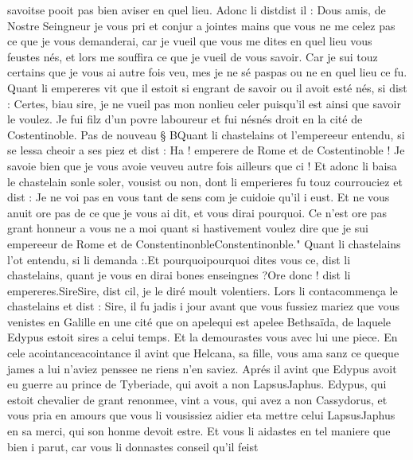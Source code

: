 \documentclass{article}
\begin{document}
\begin{pages}
   savoitse pooit pas bien aviser en quel lieu. 
   Adonc li distdist il :
   Dous amis, de Nostre Seingneur je vous pri et conjur 
      a jointes mains que vous ne me celez pas ce que je vous demanderai, car je vueil que vous me dites en quel lieu vous feustes nés,
      et lors me souffira ce que je vueil de vous savoir. Car je sui touz certains que je vous ai autre fois veu, mes je ne sé 
      paspas ou ne en quel lieu 
      ce fu.
   Quant li empereres vit que il estoit 
   si engrant de savoir ou il avoit esté nés, si dist :
   Certes, biau sire, je ne vueil pas mon nonlieu 
      celer puisqu’il est ainsi que savoir le voulez. Je fui filz d’un povre laboureur et fui 
      nésnés droit en la cité de 
      Costentinoble. \pend
\pstart Pas de nouveau § BQuant li chastelains ot 
   l’empereeur entendu, si se lessa cheoir a ses piez et dist :
   Ha ! emperere de Rome et de 
      Costentinoble ! Je savoie bien que je vous avoie 
      veuveu autre fois ailleurs que ci !
   Et adonc li baisa le chastelain 
   sonle soler, vousist ou non, 
   dont li emperieres fu touz courrouciez et dist :
   Je ne voi pas en vous tant de sens com je cuidoie qu’il i eust. Et ne vous anuit ore pas de ce que 
      je vous ai dit, et vous dirai pourquoi. Ce n’est ore pas grant honneur a vous ne a moi quant si hastivement voulez dire que 
   je sui empereeur de Rome et de 
      ConstentinonbleConstentinonble."
      Quant li chastelains l'ot entendu, si li demanda :.Et pourquoipourquoi dites vous ce, 
      dist li chastelains, 
      quant je vous en dirai bones enseingnes ?Ore donc ! dist li empereres.SireSire, dist cil, 
      je le diré moult volentiers. \pend
\pstart Lors li contacommença 
   le chastelains et dist :
   Sire, il fu jadis i jour 
      avant que vous fussiez mariez que vous venistes en Galille en une cité 
      que on apelequi est apelee Bethsaïda, 
      de laquele Edypus estoit sires a celui temps. 
      Et la demourastes vous avec lui une piece. En cele 
      acointanceacointance il avint que 
      Helcana, sa fille, vous ama sanz ce 
      queque james a lui n’aviez penssee ne riens n’en saviez. 
      Aprés il avint que Edypus avoit eu guerre au prince de 
      Tyberiade, qui avoit a non 
      LapsusJaphus. 
   Edypus, qui estoit chevalier de grant renonmee, vint a vous, 
   qui avez a non Cassydorus, et vous pria en amours que 
      vous li vousissiez aidier eta mettre celui 
         LapsusJaphus en sa merci, 
      qui son honme devoit estre. Et vous li aidastes en tel maniere que bien i parut, car vous li donnastes conseil qu’il feist 

\end{pages}
\end{document}
